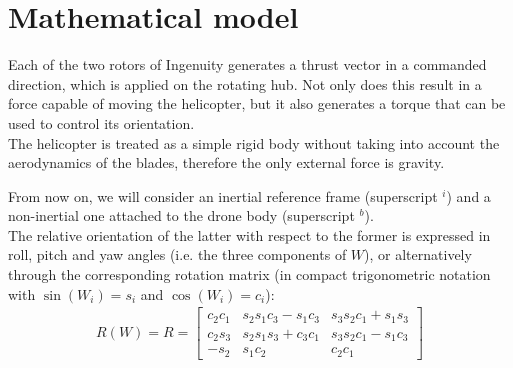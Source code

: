 \section{Mathematical model}
Each of the two rotors of Ingenuity generates a thrust vector in a commanded direction, which is applied on the rotating hub. Not only does this result in a force capable of moving the helicopter, but it also generates a torque that can be used to control its orientation. \\The helicopter is treated as a simple rigid body without taking into account the aerodynamics of the blades, therefore the only external force is gravity. 

From now on, we will consider an inertial reference frame (superscript $^i$) and a non-inertial one attached to the drone body (superscript $^b$). \\ The relative orientation of the latter with respect to the former is expressed in roll, pitch and yaw angles (i.e. the three components of $W$), or alternatively through the corresponding rotation matrix (in compact trigonometric notation with $\sin(W_i) = s_i$ and $\cos(W_i) = c_i$):
\begin{align*}
    R(W) = R = \begin{bmatrix}
        c_2 c_1& s_2 s_1 c_3 - s_1 c_3 & s_3 s_2 c_1 + s_1 s_3 \\
        c_2 s_3 & s_2 s_1 s_3 + c_3 c_1 & s_3 s_2 c_1 - s_1 c_3 \\
        -s_2 & s_1 c_2 & c_2 c_1
    \end{bmatrix}
\end{align*}


